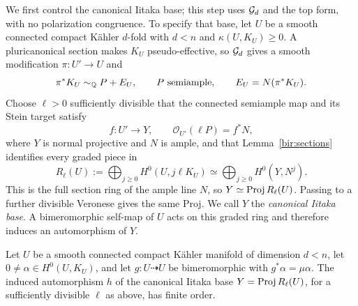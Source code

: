We first control the canonical Iitaka base; this step uses \(\mathcal G_d\)
and the top form, with no polarization congruence.  To specify that base,
let \(U\) be a smooth connected compact K\"ahler \(d\)-fold with \(d<n\)
and \(\kappa(U,K_U)\geq0\).  A pluricanonical section makes \(K_U\)
pseudo-effective, so \(\mathcal G_d\) gives a smooth
modification \(\pi:U'\to U\) and
\[
 \pi^*K_U\sim_{\mathbb Q}P+E_U,\qquad
 P\ \text{semiample},\qquad E_U=N(\pi^*K_U).
\]
Choose \(\ell>0\) sufficiently divisible that the connected semiample map
and its Stein target satisfy
\[
 f:U'\longrightarrow Y,\qquad
 \mathcal O_{U'}(\ell P)=f^*N,
\]
where \(Y\) is normal projective and \(N\) is ample, and that
Lemma~\ref{bir:sections} identifies every graded piece in
\[
 R_\ell(U):=\bigoplus_{j\geq0}H^0(U,j\ell K_U)
 \simeq \bigoplus_{j\geq0}H^0(Y,N^j).
\]
This is the full section ring of the ample line \(N\), so
\(Y\simeq\operatorname{Proj} R_\ell(U)\).  Passing to a further divisible Veronese gives
the same Proj.  We call \(Y\) the \emph{canonical Iitaka base}.  A
bimeromorphic self-map of \(U\) acts on this graded ring and therefore
induces an automorphism of \(Y\).

\begin{lemma}\label{floor:finite-base}
Let \(U\) be a smooth connected compact K\"ahler manifold of dimension
\(d<n\), let \(0\ne\alpha\in H^0(U,K_U)\), and let \(g:U\dashrightarrow U\)
be bimeromorphic with \(g^*\alpha=\mu\alpha\).  The induced automorphism
\(h\) of the canonical Iitaka base \(Y=\operatorname{Proj} R_\ell(U)\), for a sufficiently
divisible \(\ell\) as above, has finite order.
\end{lemma}

